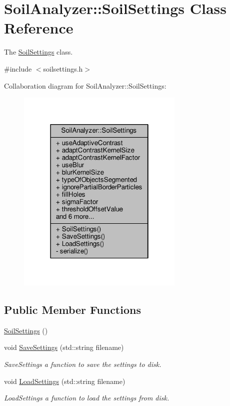 \hypertarget{class_soil_analyzer_1_1_soil_settings}{}\section{Soil\+Analyzer\+:\+:Soil\+Settings Class Reference}
\label{class_soil_analyzer_1_1_soil_settings}


The \hyperlink{class_soil_analyzer_1_1_soil_settings}{Soil\+Settings} class.  




{\ttfamily \#include $<$soilsettings.\+h$>$}



Collaboration diagram for Soil\+Analyzer\+:\+:Soil\+Settings\+:\nopagebreak
\begin{figure}[H]
\begin{center}
\leavevmode
\includegraphics[width=226pt]{class_soil_analyzer_1_1_soil_settings__coll__graph}
\end{center}
\end{figure}
\subsection*{Public Member Functions}
\begin{DoxyCompactItemize}
\item 
\hyperlink{class_soil_analyzer_1_1_soil_settings_ab8359b9a5ea27e6296e79a82789c8719}{Soil\+Settings} ()
\item 
void \hyperlink{class_soil_analyzer_1_1_soil_settings_ab211c361df454e8e1e29a4bddedeba81}{Save\+Settings} (std\+::string filename)
\begin{DoxyCompactList}\small\item\em Save\+Settings a function to save the settings to disk. \end{DoxyCompactList}\item 
void \hyperlink{class_soil_analyzer_1_1_soil_settings_a438bf660eeb7a49a676eef5da129f8d5}{Load\+Settings} (std\+::string filename)
\begin{DoxyCompactList}\small\item\em Load\+Settings a function to load the settings from disk. \end{DoxyCompactList}\end{DoxyCompactItemize}
